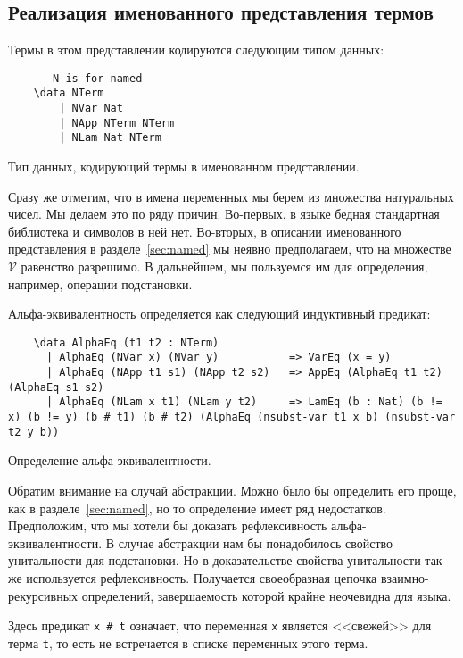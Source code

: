 \subsection{Реализация именованного представления термов}

Термы в этом представлении кодируются следующим типом данных:
\begin{listing}[H]
  \begin{verbatim}
    -- N is for named
    \data NTerm
        | NVar Nat
        | NApp NTerm NTerm
        | NLam Nat NTerm
  \end{verbatim}
  \caption{Тип данных, кодирующий термы в именованном представлении.}
\end{listing}

Сразу же отметим, что в имена переменных мы берем из множества натуральных чисел. Мы делаем это по ряду причин. Во-первых, в языке бедная стандартная библиотека и символов в ней нет. Во-вторых, в описании именованного представления в разделе~\ref{sec:named} мы неявно предполагаем, что на множестве $\mathcal{V}$ равенство разрешимо. В дальнейшем, мы пользуемся им для определения, например, операции подстановки.

Альфа-эквивалентность определяется как следующий индуктивный предикат:
\begin{listing}[H]
  \begin{verbatim}
    \data AlphaEq (t1 t2 : NTerm)
      | AlphaEq (NVar x) (NVar y)           => VarEq (x = y)
      | AlphaEq (NApp t1 s1) (NApp t2 s2)   => AppEq (AlphaEq t1 t2) (AlphaEq s1 s2)
      | AlphaEq (NLam x t1) (NLam y t2)     => LamEq (b : Nat) (b != x) (b != y) (b # t1) (b # t2) (AlphaEq (nsubst-var t1 x b) (nsubst-var t2 y b))
  \end{verbatim}
  \caption{Определение альфа-эквивалентности.}
\end{listing}

Обратим внимание на случай абстракции. Можно было бы определить его проще, как в разделе~\ref{sec:named}, но то определение имеет ряд недостатков. Предположим, что мы хотели бы доказать рефлексивность альфа-эквивалентности. В случае абстракции нам бы понадобилось свойство унитальности для подстановки. Но в доказательстве свойства унитальности так же используется рефлексивность. Получается своеобразная цепочка взаимно-рекурсивных определений, завершаемость которой крайне неочевидна для языка.

Здесь предикат \texttt{x # t} означает, что переменная \texttt{x} является <<свежей>> для терма \texttt{t}, то есть не встречается в списке переменных этого терма.


